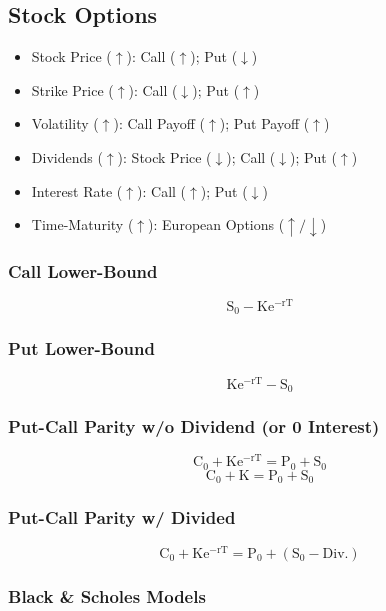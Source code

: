 \documentclass[11pt, english]{article}
\begin{document}
\newpage

	\subsection{Stock Options}

	\begin{itemize}                                                                 
        \setlength\itemsep{0cm}
		\item Stock Price ($\uparrow$): Call ($\uparrow$); Put ($\downarrow$)
		\item Strike Price ($\uparrow$): Call ($\downarrow$); Put ($\uparrow$)
		\item Volatility ($\uparrow$): Call Payoff ($\uparrow$); Put Payoff ($\uparrow$)
		\item Dividends ($\uparrow$): Stock Price ($\downarrow$); Call ($\downarrow$); Put ($\uparrow$)
		\item Interest Rate ($\uparrow$): Call ($\uparrow$); Put ($\downarrow$)
		\item Time-Maturity ($\uparrow$): European Options ($\uparrow/\downarrow$)
	\end{itemize}

		\subsubsection{Call Lower-Bound}

	$$\mathrm{S_0-Ke^{-rT}}$$

		\subsubsection{Put Lower-Bound}

	$$\mathrm{Ke^{-rT}-S_0}$$

		\subsubsection{Put-Call Parity w/o Dividend (or 0 Interest)}

	$$\mathrm{C_0+Ke^{-rT}=P_0+S_0}$$
	$$\mathrm{C_0+K=P_0+S_0}$$

		\subsubsection{Put-Call Parity w/ Divided}

	$$\mathrm{C_0+Ke^{-rT}=P_0+(S_0-Div.)}$$

		\subsubsection{Black \& Scholes Models}
\end{document}
